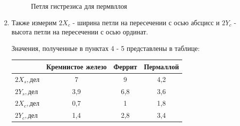 \documentclass[11pt]{article}
\begin{document}
\begin{enumerate}
\begin{figure}[H]
\caption{Петля гистрезиса для пермвллоя}
\label{pic:3}
\end{figure}


\item Также измерим $2X_c$ - ширина петли на пересечении с осью абсцисс и $2Y_c$ - высота петли на пересечении с осью ординат.



Значения, полученные в пунктах 4 - 5 представлены в таблице:

\begin{table}[h] 
\centering
\begin{tabular}{|l|c|c|c|}
\hline
          & \multicolumn{1}{l|}{Кремнистое железо} & \multicolumn{1}{l|}{Феррит} & \multicolumn{1}{l|}{Пермаллой} \\ \hline
$2X_s, дел$ & 7                                      & 9                          & 4,2                             \\ \hline
$2Y_s, дел$ & 3,9                                     & 6,8                          & 3,6                             \\ \hline
$2X_c, дел$ & 0,7                                      & 1                          & 1,8                             \\ \hline
$2Y_c, дел$ & 1,4                                     & 2,8                          & 3,4                             \\ \hline
\end{tabular}
\end{table}




\end{enumerate}
\end{document}
